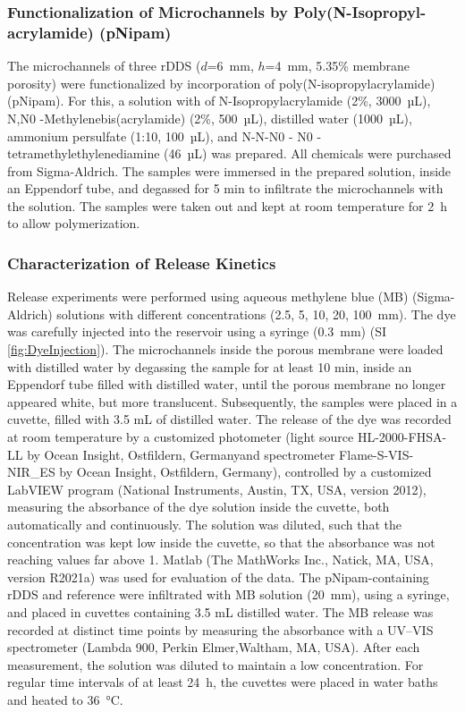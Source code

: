 \subsubsection{Functionalization of Microchannels by Poly(N-Isopropyl-\\acrylamide) (pNipam)} 
The microchannels of three rDDS ($d$=6~mm, $h$=4~mm, 5.35\% membrane porosity) were functionalized by incorporation of poly(N-isopropylacrylamide) (pNipam). For this, a solution with of N-Isopropylacrylamide (2\%, 3000~µL), N,N0 -Methylenebis(acrylamide) (2\%, 500~µL), distilled water (1000~µL), ammonium persulfate (1:10, 100~µL), and N-N-N0 - N0 -tetramethylethylenediamine (46~µL) was prepared. All chemicals were purchased from Sigma-Aldrich. The samples were immersed in the prepared solution, inside an Eppendorf tube, and degassed for 5 min to infiltrate the microchannels with the solution. The samples were taken out and kept at room temperature for 2~h to allow polymerization.

\subsubsection{Characterization of Release Kinetics}
Release experiments were performed using aqueous methylene blue (MB) (Sigma-Aldrich) solutions with different concentrations (2.5, 5, 10, 20, 100~mm). The dye was carefully injected into the reservoir using a syringe (0.3~mm) (SI \cref{fig:DyeInjection}). The microchannels inside the porous membrane were loaded with distilled water by degassing the sample for at least 10 min, inside an Eppendorf tube filled with distilled water, until the porous membrane no longer appeared white, but more translucent. Subsequently, the samples were placed in a cuvette, filled with 3.5 mL of distilled water. The release of the dye was recorded at room temperature by a customized photometer (light source HL-2000-FHSA-LL by Ocean Insight, Ostfildern, Germanyand spectrometer Flame-S-VIS-NIR\_ES by Ocean Insight, Ostfildern, Germany), controlled by a customized LabVIEW program (National Instruments, Austin, TX, USA, version 2012), measuring the absorbance of the dye solution inside the cuvette, both automatically and continuously. The solution was diluted, such that the concentration was kept low inside the cuvette, so that the absorbance was not reaching values far above 1. Matlab (The MathWorks Inc., Natick, MA, USA, version R2021a) was used for evaluation of the data. The pNipam-containing rDDS and reference were infiltrated with MB solution (20~mm), using a syringe, and placed in cuvettes containing 3.5 mL distilled water. The MB release was recorded at distinct time points by measuring the absorbance with a UV–VIS spectrometer (Lambda 900, Perkin Elmer,Waltham, MA, USA). After each measurement, the solution was diluted to maintain a low concentration. For regular time intervals of at least 24~h, the cuvettes were placed in water baths and heated to 36~°C.

